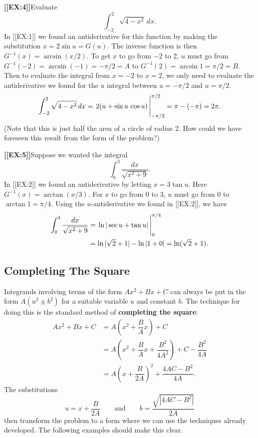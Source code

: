 {\bf [[EX:4]]}\quad Evaluate
\[
\int_{-2}^2 \sqrt{4-x^2}\,dx.
\]
In [[EX:1]] we found an antiderivative for this function by making
the substitution $x= 2\sin{u}=G(u)$.  The inverse function is then
$G^{-1}(x)=\arcsin(x/2)$. To get $x$ to go from $-2$ to 2, $u$ must go
from $G^{-1}(-2)=\arcsin(-1)=-\pi/2=A$ to
$G^{-1}(2)=\arcsin{1}=\pi/2=B$.  Then to evaluate the integral from
$x=-2$ to $x=2$, we only need to evaluate the antiderivative we found
for the $u$ integral between $u=-\pi/2$ and $u=\pi/2$.
\[
\int_{-2}^2 \sqrt{4-x^2}\,dx
  = \left.2(u+\sin{u}\,\cos{u})\rule{0pt}{16pt}\,\right|_{-\pi/2}^{\pi/2} 
  = \pi-(-\pi)=2\pi.
\] 
(Note that this is just half the area of a circle of radius 2.  How
  could we have foreseen this result from the form of the problem?)





{\bf [[EX:5]]}\quad Suppose we wanted the integral
\[
\int_0^3 \dfrac{dx}{\sqrt{x^2+9}}.
\]
In [[EX:2]] we found an antiderivative by letting $x=3\tan{u}$.  Here
$G^{-1}(x)=\arctan(x/3)$. For $x$ to go from 0 to $3$, $u$ must go
from 0 to $\arctan{1}=\pi/4$.  Using the $u$-antiderivative we found
in [[EX:2]], we have
\begin{align*}
\dint_0^3 \dfrac{dx}{\sqrt{x^2+9}}
  &= \left.\ln|\sec{u}+\tan{u}|\rule{0pt}{16pt}\,\right|_0^{\pi/4} \\
  &= \ln{|\sqrt{2}+1|}-\ln{|1+0|}=\ln(\sqrt{2}+1).
\end{align*}


\subsection{Completing The Square}
\label{subsec:completing-the-square}

Integrands involving terms of the form $Ax^2+Bx+C$ can always be put
in the form $A( u^2\pm b^2)$ for a suitable variable $u$ and constant
$b$.  The technique for doing this is the standard method of {\bf
  completing the square}:
\begin{align*}
Ax^2+Bx+C
  &= A\left(x^2 + \dfrac{B}{A}x\right)+C \\
  &= A\left(x^2 + \dfrac{B}{A}x + \dfrac{B^2}{4A^2}\right)+C 
         - \dfrac{B^2}{4A} \\
  &= A\left(x + \dfrac{B}{2A}\right)^{\!2} + \dfrac{4AC-B^2}{4A}.
\end{align*}
The substitutions
\[
u = x+ \dfrac{B}{2A} \qquad \mbox{and} \qquad 
  b = \dfrac{\sqrt{|4AC-B^2|}}{2A}
\]
then transform the problem to a form where we can use the techniques
already developed.  The following examples should make this clear.





